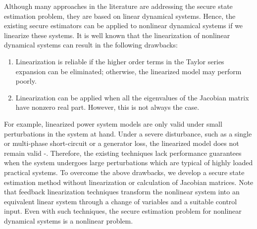 \documentclass[../thesis.tex]{subfiles}
\begin{document}
Although many approaches in the literature are addressing the secure state estimation problem, they are based
on linear dynamical systems. Hence, the existing secure estimators can be applied to nonlinear dynamical systems if we linearize these systems. It is well known that the linearization of nonlinear dynamical systems can result in the following drawbacks:
\begin{enumerate}
\item Linearization is reliable if the higher order terms in the Taylor series expansion can be eliminated; otherwise, the linearized model may perform poorly. %
\item Linearization can be applied when all the eigenvalues of the Jacobian matrix have nonzero real part. However, this is not always the case.
\end{enumerate}
For example, linearized power system models are only valid under small perturbations in the system at hand. Under a severe disturbance, such as a single or multi-phase short-circuit or a generator loss, the linearized model does not remain valid \cite{Kundur}-\!\!\cite{nonlin_est}. Therefore, the existing techniques lack performance guarantees when the system undergoes large perturbations which are typical of highly loaded practical systems. To overcome the above drawbacks, we develop a secure state estimation method without linearization or calculation of Jacobian matrices. Note that feedback linearization techniques transform the nonlinear system into an equivalent linear system through a change of variables and a suitable control input. Even with such techniques, the secure estimation problem for nonlinear dynamical systems is a nonlinear problem.
\end{document}
